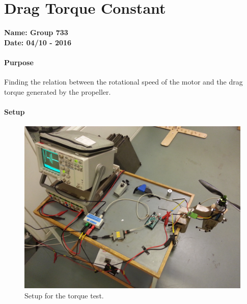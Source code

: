 \chapter{Drag Torque Constant}\label{app:TorqueTest} 
\textbf{Name: Group 733}\\
\textbf{Date: 04/10 - 2016}

\subsubsection{Purpose}
Finding the relation between the rotational speed of the motor and the drag torque generated by the propeller.

\subsubsection{Setup}
\begin{figure}[H]
	\centering
	\includegraphics[scale=0.05]{figures/TorqueTestSetup}
	\caption{Setup for the torque test.}
	\label{TorqueTest}
\end{figure}

